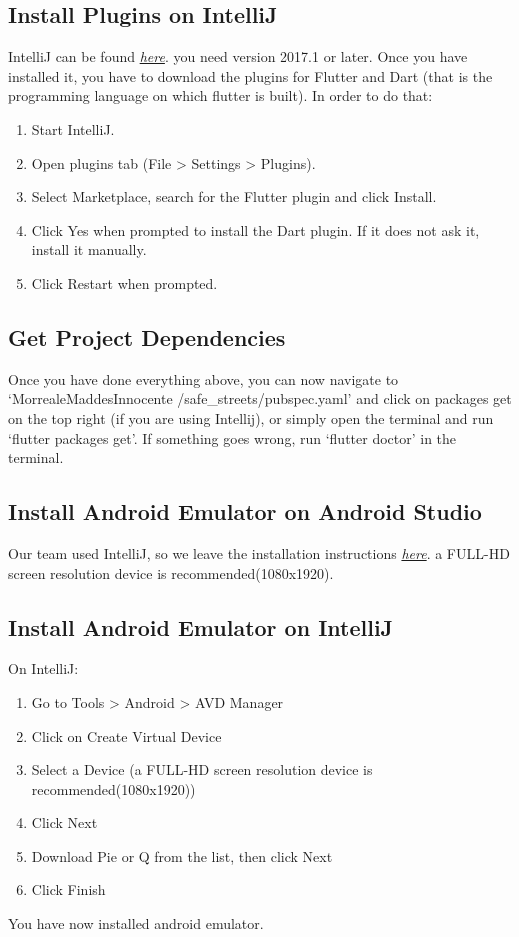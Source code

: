 \documentclass[../ITD.tex]{subfiles}
\begin{document}
    \subsection{Install Plugins on IntelliJ}\label{subsec:install-plugins-on-intellij}
    IntelliJ can be found \href{https://www.jetbrains.com/idea/download/}{\textit{here}}.
    you need version 2017.1 or later.
    Once you have installed it, you have to download the plugins for Flutter and Dart (that is the programming language on which flutter is built).
    In order to do that:
    \begin{enumerate}
        \item Start IntelliJ.
        \item Open plugins tab (File > Settings > Plugins).
        \item Select Marketplace, search for the Flutter plugin and click Install.
        \item Click Yes when prompted to install the Dart plugin.
        If it does not ask it, install it manually.
        \item Click Restart when prompted.
    \end{enumerate}
    \subsection{Get Project Dependencies}\label{subsec:get-project-dependencies}
    Once you have done everything above, you can now navigate to `MorrealeMaddesInnocente
    /safe\_streets/pubspec.yaml'
    and click on packages get on the top right (if you are using Intellij), or simply open the terminal and run
    `flutter packages get'.
    If something goes wrong, run `flutter doctor' in the terminal.
    \subsection{Install Android Emulator on Android Studio}\label{subsec:install-android-emulator-on-android-studio}
    Our team used IntelliJ, so we leave the installation instructions
    \href{https://docs.expo.io/versions/latest/workflow/android-studio-emulator/}{\textit{here}}.
    a FULL-HD screen resolution device is recommended(1080x1920).
    \subsection{Install Android Emulator on IntelliJ}\label{subsec:install-android-emulator-on-intellij}
    On IntelliJ:
    \begin{enumerate}
        \item Go to Tools > Android > AVD Manager
        \item Click on Create Virtual Device
        \item Select a Device (a FULL-HD screen resolution device is recommended(1080x1920))
        \item Click Next
        \item Download Pie or Q from the list, then click Next
        \item Click Finish
    \end{enumerate}
    You have now installed android emulator.
\end{document}
